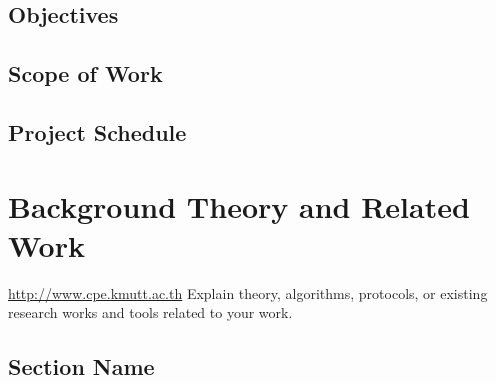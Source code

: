 \documentclass[12pt,oneside,openright,a4paper]{explo-english-project}
\begin{document}
\section{Objectives}


\section{Scope of Work}


\section{Project Schedule}




\chapter{Background Theory and Related Work}

\url{http://www.cpe.kmutt.ac.th}
Explain theory, algorithms, protocols, or existing research works and tools related to your work. \cite{santi05b} \cite{bworld,hypersense}

\section{Section Name}




\end{document}
